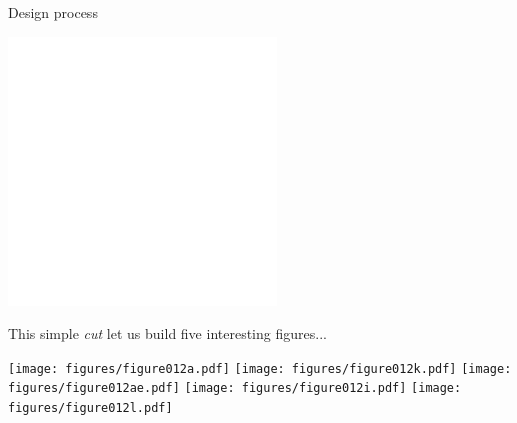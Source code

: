 \documentclass[14pt]{beamer}
\begin{document}

    \begin{frame}{Design process}
        \begin{center}
            \includegraphics[height=15ex]{figures/figure001d.pdf} \\

            \bigskip\bigskip

            This simple \emph{cut} let us build five interesting figures...

            \bigskip\bigskip

            \texttt{[image: figures/figure012a.pdf]}\quad
            \texttt{[image: figures/figure012k.pdf]}\;\;
            \texttt{[image: figures/figure012ae.pdf]}
            \texttt{[image: figures/figure012i.pdf]}\quad
            \texttt{[image: figures/figure012l.pdf]}\\
        \end{center}
    \end{frame}

\end{document}

